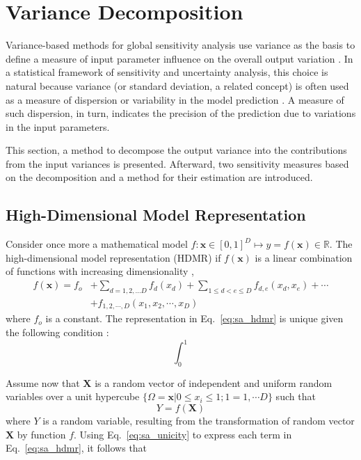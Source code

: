 \section{Variance Decomposition}\label{sec:sa_variance_decomposition}

Variance-based methods for global sensitivity analysis use variance as the basis to define a measure of input parameter influence on the overall output variation \cite{Cacuci2004}.
In a statistical framework of sensitivity and uncertainty analysis, 
this choice is natural because variance (or standard deviation, a related concept) is often used as a measure of dispersion or variability in the model prediction \cite{Saltelli2008}.
A measure of such dispersion, in turn, indicates the precision of the prediction due to variations in the input parameters.

This section, a method to decompose the output variance into the contributions from the input variances is presented.
Afterward, two sensitivity measures based on the decomposition and a method for their estimation are introduced.

\subsection{High-Dimensional Model Representation}\label{sec:sa_hdmr}

Consider once more a mathematical model $f: \mathbf{x} \in [0,1]^D \mapsto y = f(\mathbf{x}) \in \mathbb{R}$.
The high-dimensional model representation (HDMR) if $f(\mathbf{x})$ is a linear combination of functions with increasing dimensionality \cite{Li2001},
\begin{equation}
	\begin{split}
		f(\mathbf{x}) = f_o & + \sum_{d=1,2,...D} f_d(x_d) + \sum_{1\leq d < e \leq D} f_{d,e} (x_d, x_e) + \cdots  \\
	                      & + f_{1,2,\cdots,D} (x_1, x_2, \cdots, x_D)
	\end{split}
\label{eq:sa_hdmr}
\end{equation}
where $f_o$ is a constant. 
The representation in Eq.~\ref{eq:sa_hdmr} is unique given the following condition \cite{Sobol2001}:
\begin{equation}
	\int_{0}^{1} 
\label{eq:sa_unicity}
\end{equation}

Assume now that $\mathbf{X}$ is a random vector of independent and uniform random variables over a unit hypercube
$\{\Omega = \mathbf{x} | 0 \leq x_i  \leq 1; 1 = 1,\cdots D\}$ such that
\begin{equation}
	Y = f(\mathbf{X})
\label{eq:sa_random_function}
\end{equation}
where $Y$ is a random variable, resulting from the transformation of random vector $\mathbf{X}$ by function $f$.
Using Eq.~\ref{eq:sa_unicity} to express each term in Eq.~\ref{eq:sa_hdmr}, it follows that
